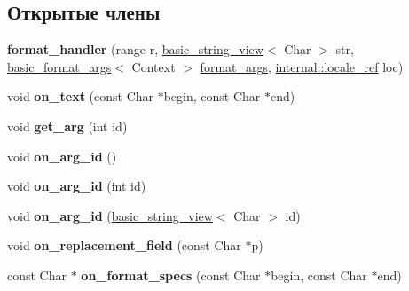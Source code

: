 \subsection*{Открытые члены}
\begin{DoxyCompactItemize}
\item 
\mbox{\label{structformat__handler_a9bfd742776e1ff31e5ef9801d28fcf78}} 
{\bfseries format\+\_\+handler} (range r, \hyperlink{classbasic__string__view}{basic\+\_\+string\+\_\+view}$<$ Char $>$ str, \hyperlink{classbasic__format__args}{basic\+\_\+format\+\_\+args}$<$ Context $>$ \hyperlink{structformat__args}{format\+\_\+args}, \hyperlink{classinternal_1_1locale__ref}{internal\+::locale\+\_\+ref} loc)
\item 
\mbox{\label{structformat__handler_a0658a1b87089088fae4267f567e9ee7d}} 
void {\bfseries on\+\_\+text} (const Char $\ast$begin, const Char $\ast$end)
\item 
\mbox{\label{structformat__handler_a31036c89b61eae69c01703fea5ec610d}} 
void {\bfseries get\+\_\+arg} (int id)
\item 
\mbox{\label{structformat__handler_a68a3fd78bb89496cb6b27f67b0ecb168}} 
void {\bfseries on\+\_\+arg\+\_\+id} ()
\item 
\mbox{\label{structformat__handler_ac8858a7695097d5da321adb0b3b1e340}} 
void {\bfseries on\+\_\+arg\+\_\+id} (int id)
\item 
\mbox{\label{structformat__handler_a5030233b6e1cb1824e131712a3ec5156}} 
void {\bfseries on\+\_\+arg\+\_\+id} (\hyperlink{classbasic__string__view}{basic\+\_\+string\+\_\+view}$<$ Char $>$ id)
\item 
\mbox{\label{structformat__handler_abe898802a15ef6686480569ab638b38a}} 
void {\bfseries on\+\_\+replacement\+\_\+field} (const Char $\ast$p)
\item 
\mbox{\label{structformat__handler_a4d16ddae0958acb12d0606038c393b24}} 
const Char $\ast$ {\bfseries on\+\_\+format\+\_\+specs} (const Char $\ast$begin, const Char $\ast$end)
\end{DoxyCompactItemize}
